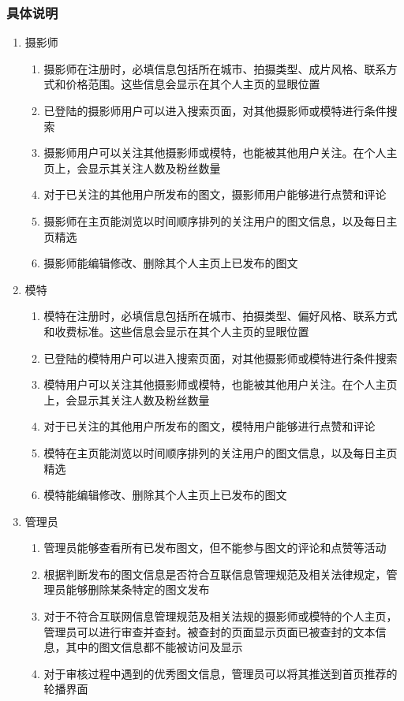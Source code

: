 \documentclass[a4paper,14pt]{ctexart}
\begin{document}
\subsubsection{具体说明}
\begin{enumerate}[1)]
\item 摄影师\par
\begin{enumerate}[i]
\item 摄影师在注册时，必填信息包括所在城市、拍摄类型、成片风格、联系方式和价格范围。这些信息会显示在其个人主页的显眼位置
\item 已登陆的摄影师用户可以进入搜索页面，对其他摄影师或模特进行条件搜索
\item 摄影师用户可以关注其他摄影师或模特，也能被其他用户关注。在个人主页上，会显示其关注人数及粉丝数量
\item 对于已关注的其他用户所发布的图文，摄影师用户能够进行点赞和评论
\item 摄影师在主页能浏览以时间顺序排列的关注用户的图文信息，以及每日主页精选
\item 摄影师能编辑修改、删除其个人主页上已发布的图文

\end{enumerate}
\item 模特\par
\begin{enumerate}[i]
\item 模特在注册时，必填信息包括所在城市、拍摄类型、偏好风格、联系方式和收费标准。这些信息会显示在其个人主页的显眼位置
\item 已登陆的模特用户可以进入搜索页面，对其他摄影师或模特进行条件搜索
\item 模特用户可以关注其他摄影师或模特，也能被其他用户关注。在个人主页上，会显示其关注人数及粉丝数量
\item 对于已关注的其他用户所发布的图文，模特用户能够进行点赞和评论
\item 模特在主页能浏览以时间顺序排列的关注用户的图文信息，以及每日主页精选
\item 模特能编辑修改、删除其个人主页上已发布的图文

\end{enumerate}
\item 管理员\par
\begin{enumerate}[i]
\item 管理员能够查看所有已发布图文，但不能参与图文的评论和点赞等活动
\item 根据判断发布的图文信息是否符合互联信息管理规范及相关法律规定，管理员能够删除某条特定的图文发布
\item 	对于不符合互联网信息管理规范及相关法规的摄影师或模特的个人主页，管理员可以进行审查并查封。被查封的页面显示页面已被查封的文本信息，其中的图文信息都不能被访问及显示
\item 对于审核过程中遇到的优秀图文信息，管理员可以将其推送到首页推荐的轮播界面

\end{enumerate}
\end{enumerate}
\end{document}
